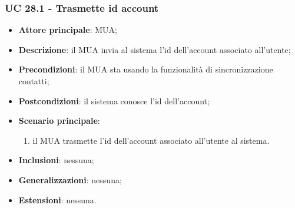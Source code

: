     \subsubsection{UC 28.1 - Trasmette id account} \label{sec:UC28.1}
    \begin{itemize}
        \item \textbf{Attore principale}: MUA;
        \item \textbf{Descrizione}: il MUA invia al sistema l'id dell'account associato all'utente;
        \item \textbf{Precondizioni}: il MUA sta usando la funzionalità di sincronizzazione contatti;
        \item \textbf{Postcondizioni}: il sistema conosce l'id dell'account;
        \item \textbf{Scenario principale}:
            \begin{enumerate}
                \item il MUA trasmette l'id dell'account associato all'utente al sistema.
            \end{enumerate}
        \item \textbf{Inclusioni}: nessuna;
        \item \textbf{Generalizzazioni}: nessuna;
        \item \textbf{Estensioni}: nessuna.
    \end{itemize}

